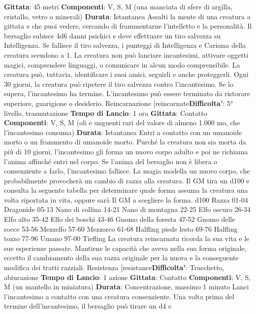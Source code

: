 \begin{multicols}{2}
\textbf{Gittata}: 45 metri
\textbf{Componenti}: V, S, M (una manciata di sfere di argilla,
cristallo, vetro o minerali)
\textbf{Durata}: Istantanea
Assalti la mente di una creatura a gittata e che puoi
vedere, cercando di frammentarne l’intelletto e la
personalità. Il bersaglio subisce 4d6 danni psichici e
deve effettuare un tiro salvezza su Intelligenza.
Se fallisce il tiro salvezza, i punteggi di Intelligenza e
Carisma della creatura scendono a 1. La creatura non
può lanciare incantesimi, attivare oggetti magici,
comprendere linguaggi, o comunicare in alcun modo
comprensibile. La creatura può, tuttavia, identificare i
suoi amici, seguirli e anche proteggerli.
Ogni 30 giorni, la creatura può ripetere il tiro salvezza
contro l’incantesimo. Se lo supera, l’incantesimo ha
termine.
L’incantesimo può essere terminato da ristorare
superiore, guarigione o desiderio.
Reincarnazione
[reincarnate\textbf{Difficolta'}:
5° livello, trasmutazione
\textbf{Tempo di Lancio}: 1 ora
\textbf{Gittata}: Contatto
\textbf{Componenti}: V, S, M (oli e unguenti rari del valore di
almeno 1.000 mo, che l’incantesimo consuma)
\textbf{Durata}: Istantanea
Entri a contatto con un umanoide morto o un frammento
di umanoide morto. Purché la creatura non sia morta da
più di 10 giorni, l’incantesimo gli forma un nuovo corpo
adulto e poi ne richiama l’anima affinché entri nel corpo.
Se l’anima del bersaglio non è libera o consenziente a
farlo, l’incantesimo fallisce.
La magia modella un nuovo corpo, che probabilmente
provocherà un cambio di razza alla creatura. Il GM tira
un d100 e consulta la seguente tabella per determinare
quale forma assuma la creatura una volta riportata in
vita, oppure sarà Il GM a scegliere la forma.
d100 Razza
01-04 Dragonide
05-13 Nano di collina
14-21 Nano di montagna
22-25 Elfo oscuro
26-34 Elfo alto
35-42 Elfo dei boschi
43-46 Gnomo della foresta
47-52 Gnomo delle rocce
53-56 Mezzelfo
57-60 Mezzorco
61-68 Halfling piede lesto
69-76 Halfling tozzo
77-96 Umano
97-00 Tiefling
La creatura reincarnata ricorda la sua vita e le sue
esperienze passate. Mantiene le capacità che aveva
nella sua forma originale, eccetto il cambiamento della
sua razza originale per la nuova e la conseguente
modifica dei tratti razziali.
Resistenza
[resistance\textbf{Difficolta'}:
Trucchetto, abiurazione
\textbf{Tempo di Lancio}: 1 azione
\textbf{Gittata}: Contatto
\textbf{Componenti}: V, S, M (un mantello in miniatura)
\textbf{Durata}: Concentrazione, massimo 1 minuto
Lanci l’incantesimo a contatto con una creatura
consenziente. Una volta prima del termine
dell’incantesimo, il bersaglio può tirare un d4 e

\end{multicols}
